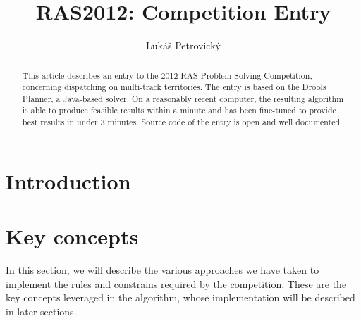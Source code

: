 \documentclass[10pt,a4paper,final]{article}
\author{Lukáš Petrovický}
\title{RAS2012: Competition Entry}
\begin{document}
\maketitle

\begin{abstract}
This article describes an entry to the 2012 RAS Problem Solving Competition, concerning dispatching on multi-track territories. The entry is based on the Drools Planner, a Java-based solver. On a reasonably recent computer, the resulting algorithm is able to produce feasible results within a minute and has been fine-tuned to provide best results in under 3 minutes. Source code of the entry is open and well documented.
\end{abstract}

\section{Introduction}

\section{Key concepts}

In this section, we will describe the various approaches we have taken to implement the rules and constrains required by the competition. These are the key concepts leveraged in the algorithm, whose implementation will be described in later sections.
\end{document}
